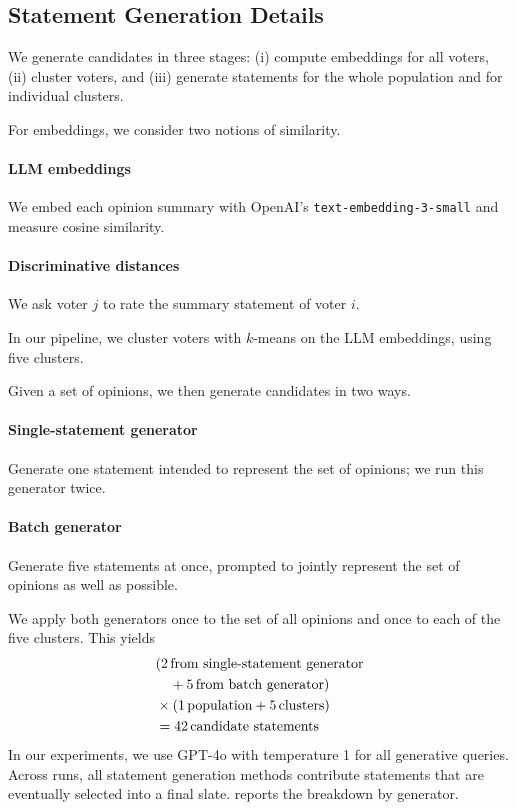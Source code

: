 \documentclass[11pt]{article}
\begin{document}
\subsection{Statement Generation Details}
\label{sec:statement-generation}

We generate candidates in three stages: (i) compute embeddings for all voters, (ii) cluster voters, and (iii) generate statements for the whole population and for individual clusters.

For embeddings, we consider two notions of similarity.

\paragraph{LLM embeddings}
We embed each opinion summary with OpenAI's \texttt{text-embedding-3-small} and measure cosine similarity.

\paragraph{Discriminative distances \citep{fish-v2}}
We ask voter \(j\) to rate the summary statement of voter \(i\).

In our pipeline, we cluster voters with \(k\)-means on the LLM embeddings, using five clusters.

Given a set of opinions, we then generate candidates in two ways.

\paragraph{Single-statement generator}
Generate one statement intended to represent the set of opinions; we run this generator twice.

\paragraph{Batch generator}
Generate five statements at once, prompted to jointly represent the set of opinions as well as possible.

We apply both generators once to the set of all opinions and once to each of the five clusters. This yields
\[
\begin{aligned}
&(2\,\text{from single\text{-}statement generator} \\
&\quad + 5\,\text{from batch generator}) \\
&\times (1\,\text{population} + 5\,\text{clusters}) \\
&= 42\,\text{candidate statements}
\end{aligned}
\]
In our experiments, we use GPT-4o with temperature 1 for all generative queries. Across runs, all statement generation methods contribute statements that are eventually selected into a final slate.  reports the breakdown by generator.
\end{document}

